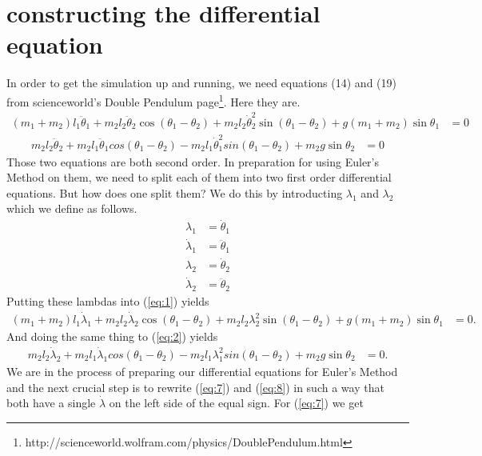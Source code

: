 \documentclass[paper=a4, fontsize=11pt]{scrartcl} %
\numberwithin{equation}{section} %
\numberwithin{figure}{section} %
\numberwithin{table}{section} %
\begin{document}
\section{constructing the differential equation}
In order to get the simulation up and running, we need equations (14) and (19) from scienceworld's Double Pendulum page\footnote{http://scienceworld.wolfram.com/physics/DoublePendulum.html}.
Here they are.
\begin{align} \label{eq:1}
  (m_1 + m_2) l_1 \ddot{\theta}_1 + m_2 l_2 \ddot{\theta}_2 \cos(\theta_1 - \theta_2)
  + m_2 l_2 \dot{\theta}^2_2 \sin(\theta_1 - \theta_2) + g (m_1 + m_2) \sin \theta_1 &= 0
\end{align}
\begin{align} \label{eq:2}
  m_2 l_2 \ddot{\theta}_2 + m_2 l_1 \ddot{\theta}_1 cos(\theta_1 - \theta_2)
  - m_2 l_1 \dot{\theta}^2_1 sin(\theta_1 - \theta_2) + m_2 g \sin \theta_2 &= 0
\end{align}
Those two equations are both second order. In preparation for using Euler's Method on them, we need to split each of them into two first order differential equations.
But how does one split them? We do this by introducting $\lambda_1$ and $\lambda_2$ which we define as follows.
\begin{align} 
  \lambda_1 &= \dot{\theta}_1 \label{eq:3} \\
  \dot{\lambda}_1 &= \ddot{\theta}_1 \label{eq:4}
  \\
  \lambda_2 &= \dot{\theta}_2 \label{eq:5} \\
  \dot{\lambda}_2 &= \ddot{\theta}_2 \label{eq:6}
\end{align}
Putting these lambdas into (\ref{eq:1}) yields
\begin{align} \label{eq:7}
  (m_1 + m_2) l_1 \dot{\lambda}_1 + m_2 l_2 \dot{\lambda}_2 \cos(\theta_1 - \theta_2)
  + m_2 l_2 \lambda^2_2 \sin(\theta_1 - \theta_2) + g (m_1 + m_2) \sin \theta_1 &= 0.
\end{align}
And doing the same thing to (\ref{eq:2}) yields
\begin{align} \label{eq:8}
  m_2 l_2 \dot{\lambda}_2 + m_2 l_1 \dot{\lambda}_1 cos(\theta_1 - \theta_2)
  - m_2 l_1 \lambda^2_1 sin(\theta_1 - \theta_2) + m_2 g \sin \theta_2 &= 0.
\end{align}
We are in the process of preparing our differential equations for Euler's Method and the next crucial step is to rewrite (\ref{eq:7}) and (\ref{eq:8})
in such a way that both have a single $\dot{\lambda}$ on the left side of the equal sign. For (\ref{eq:7}) we get
\end{document}

